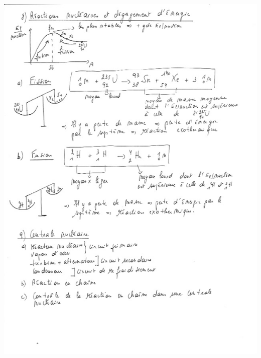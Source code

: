 \includegraphics[width=19.731cm,height=27.236cm]{Pictures/10000001000002620000034931F21BAF71411AAA.png}
